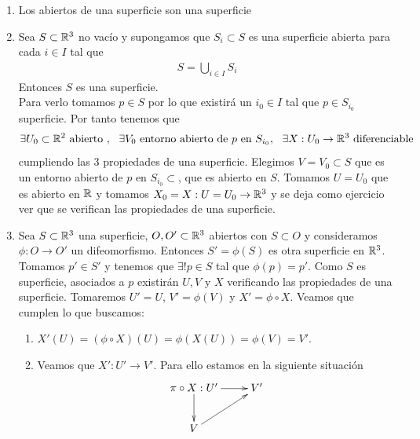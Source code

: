 \begin{ejemplo}
\begin{enumerate}
        \item Los abiertos de una superficie son una superficie
        
        \item Sea $S\subset \mathbb{R}^3$ no vacío y supongamos que $S_i\subset S$ es una superficie abierta para cada $i\in I$ tal que
        \begin{gather*}
            S=\bigcup\limits_{i\in I}S_i
        \end{gather*} 
        Entonces $S$ es una superficie.\\

        Para verlo tomamos $p\in S$ por lo que existirá un $i_0\in I$ tal que $p\in S_{i_0}$ superficie. Por tanto tenemos que 
        \begin{gather*}
            \exists U_0\subset \mathbb{R}^2 \text{ abierto },\ \ \exists V_0 \text{ entorno abierto de $p$ en $S_{i_0}$},\ \ \exists X:U_0\to \mathbb{R}^3\text{ diferenciable}
        \end{gather*}
        cumpliendo las 3 propiedades de una superficie. Elegimos $V=V_0\subset S$ que es un entorno abierto de $p$ en $S_{i_0}\subset$, que es abierto en $S$. Tomamos $U=U_0$ que es abierto en $\mathbb{R}$ y tomamos $X_0=X:U=U_0 \to \mathbb{R}^3$ y se deja como ejercicio ver que se verifican las propiedades de una superficie.

        \item Sea $S\subset \mathbb{R}^3$ una superficie, $O,O'\subset \mathbb{R}^3$ abiertos con $S\subset O$ y consideramos $\phi:O\to O'$ un difeomorfismo. Entonces $S'=\phi(S)$ es otra superficie en $\mathbb{R}^3$.\\
        
        Tomamos $p'\in S'$ y tenemos que $\exists!p\in S$ tal que $\phi(p)=p'$. Como $S$ es superficie, asociados a $p$ existirán $U,V$ y $X$ verificando las propiedades de una superficie. Tomaremos $U'=U$, $V'=\phi(V)$ y $X'=\phi \circ X$. Veamos que cumplen lo que buscamos:
        \begin{enumerate}
            \item $X'(U)=(\phi \circ X)(U)=\phi(X(U)) = \phi(V)=V'$.
            \item Veamos que $X':U'\to V'$. Para ello estamos en la siguiente situación
            \begin{gather*}
                \xymatrix{
                    \pi \circ X: U' \ar[d]  \ar[r] & V'\\
                    V \ar[ur]
                }
            \end{gather*}


\end{enumerate}
\end{enumerate}
\end{ejemplo}
